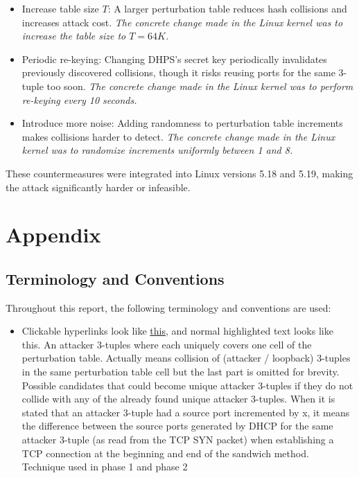 \documentclass{report}
\begin{document}
\begin{itemize}
	\item \alert{Increase table size $T$:}
	A larger perturbation table reduces hash collisions and increases attack cost.
	\textit{The concrete change made in the Linux kernel was to increase the table size to $T = 64K$.}

	\item \alert{Periodic re-keying:}
	Changing DHPS’s secret key periodically invalidates previously discovered collisions, though it risks reusing ports for the same 3-tuple too soon.
	\textit{The concrete change made in the Linux kernel was to perform re-keying every 10 seconds.}

	\item \alert{Introduce more noise:}
	Adding randomness to perturbation table increments makes collisions harder to detect.
	\textit{The concrete change made in the Linux kernel was to randomize increments uniformly between 1 and 8.}
\end{itemize}

These countermeasures were integrated into Linux versions 5.18 and 5.19, making the attack significantly harder or infeasible.

\vspace{0.5cm}
\chapter{Appendix}
\label{sec:appendix}

\section{Terminology and Conventions}
\label{sec:terminology and conventions}

Throughout this report, the following terminology and conventions are used:
\begin{itemize}
	\item Clickable hyperlinks look like \hyperref[sec:terminology and conventions]{this}, and normal highlighted text looks like \alert{this}.
	 An attacker 3-tuples where each uniquely covers one cell of the perturbation table.
	 Actually means collision of (attacker / loopback) 3-tuples in the same perturbation table cell but the last part is omitted for brevity.
	 Possible candidates that could become unique attacker 3-tuples if they do not collide with any of the already found unique attacker 3-tuples.
	 When it is stated that an attacker 3-tuple had a source port incremented by x, it means the difference between the source ports generated by DHCP for the same attacker 3-tuple (as read from the TCP SYN packet) when establishing a TCP connection at the beginning and end of the sandwich method.
	 Technique used in phase 1 and phase 2 
\end{itemize}
\end{document}
